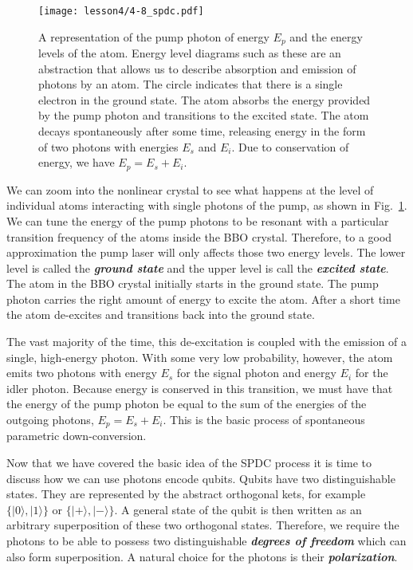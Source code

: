 \begin{figure}[t]
    \centering
    \texttt{[image: lesson4/4-8\_spdc.pdf]}
    \caption[Pump photon exciting an atom.]{A representation of the pump photon of energy $E_p$ and the energy levels of the atom. Energy level diagrams such as these are an abstraction that allows us to describe absorption and emission of photons by an atom. The circle indicates that there is a single electron in the ground state.
    The atom absorbs the energy provided by the pump photon and transitions to the excited state. The atom decays spontaneously after some time, releasing energy in the form of two photons with energies $E_s$ and $E_i$. Due to conservation of energy, we have $E_p = E_s + E_i$.}
    \label{fig:spdc-energy-levels}
\end{figure}

We can zoom into the nonlinear crystal to see what happens at the level of individual atoms interacting with single photons of the pump, as shown in Fig.~\ref{fig:spdc-energy-levels}.
We can tune the energy of the pump photons to be resonant with a particular transition frequency of the atoms inside the BBO crystal.
Therefore, to a good approximation the pump laser will only affects those two energy levels.
The lower level is called the \textbf{\emph{ground state}} and the upper level is call the \textbf{\emph{excited state}}.
The atom in the BBO crystal initially starts in the ground state.
The pump photon carries the right amount of energy to excite the atom.
After a short time the atom de-excites and transitions back into the ground state.

The vast majority of the time, this de-excitation is coupled with the emission of a single, high-energy photon.
With some very low probability, however, the atom emits two photons with energy $E_s$ for the signal photon and energy $E_i$ for the idler photon.
Because energy is conserved in this transition, we must have that the energy of the pump photon be equal to the sum of the energies of the outgoing photons, $E_p = E_s + E_i$.
This is the basic process of spontaneous parametric down-conversion.

Now that we have covered the basic idea of the SPDC process it is time to discuss how we can use photons encode qubits.
Qubits have two distinguishable states.
They are represented by the abstract orthogonal kets, for example $\{|0\rangle,|1\rangle\}$ or $\{|+\rangle,|-\rangle\}$.
A general state of the qubit is then written as an arbitrary superposition of these two orthogonal states.
Therefore, we require the photons to be able to possess two distinguishable \textbf{\emph{degrees of freedom}} which can also form superposition.
A natural choice for the photons is their \textbf{\emph{polarization}}.

